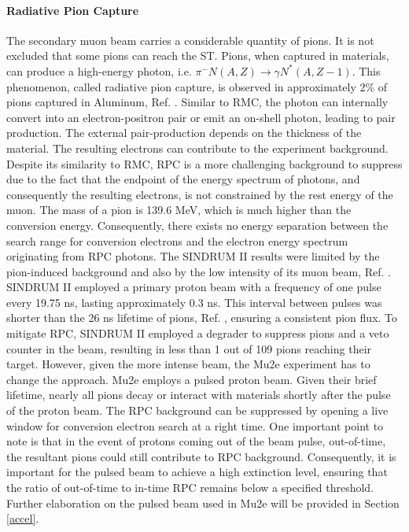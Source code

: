 \paragraph{Radiative Pion Capture}
The secondary muon beam carries a considerable quantity of pions.  It is not excluded 
that some pions can reach the ST. Pions, when captured in materials, can 
produce a high-energy photon, i.e. $\pi^- N(A,Z) \rightarrow \gamma N ^* (A,Z-1)$. 
This phenomenon, called radiative pion capture, is observed in approximately 2\% of 
pions captured in Aluminum, Ref. \cite{PhysRevC.5.1867}. Similar to RMC, the photon 
can internally convert into an electron-positron pair or emit an on-shell photon, 
leading to pair production. The external pair-production depends on the thickness 
of the material. The resulting electrons can contribute to the experiment background. 
Despite its similarity to RMC, RPC is a more challenging background to suppress due to 
the fact that the endpoint of the energy spectrum of photons, and consequently the 
resulting electrons, is not constrained by the rest energy of the muon. The mass of 
a pion is 139.6 MeV, which is much higher than the conversion energy. Consequently, 
there exists no energy separation between the search range for conversion electrons 
and the electron energy spectrum originating from RPC photons. The SINDRUM II results 
were limited by the pion-induced background and also by the low intensity of its muon 
beam, Ref. \cite{SINDRUMII:2006dvw}. SINDRUM II employed a primary proton beam with a 
frequency of one pulse every 19.75 ns, lasting approximately 0.3 ns. This interval 
between pulses was shorter than the 26 ns lifetime of pions, Ref. \cite{zyla}, 
ensuring a consistent pion flux. To mitigate RPC, SINDRUM II employed a degrader to suppress 
pions and a veto counter in the beam, resulting in less than 1 out of 109 pions reaching their 
target. However, given the more intense beam, the Mu2e experiment has to change the approach. 
Mu2e employs a pulsed proton beam. Given their brief lifetime, nearly all pions decay or 
interact with materials shortly after the pulse of the proton beam. The RPC background 
can be suppressed by opening a live window for conversion electron search at a right time. 
One important point to note is that in the event of protons coming out of the beam pulse, 
out-of-time, the resultant pions could still contribute to RPC background. Consequently, 
it is important for the pulsed beam to achieve a high extinction level, ensuring that the 
ratio of out-of-time to in-time RPC remains below a specified threshold. Further elaboration 
on the pulsed beam used in Mu2e will be provided in Section \ref{accel}.
